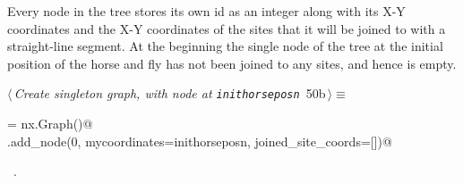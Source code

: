 \documentclass[11.5pt]{report}
\begin{document}
\vspace{-0.8cm} \newchunk Every node in the tree stores its own id as an integer along with 
its X-Y coordinates and the X-Y coordinates of the sites that it will be joined to with a 
straight-line segment. At the beginning the single node of the tree at the initial position
of the horse and fly has not been joined to any sites, and hence is empty. 

\begin{flushleft} \small
\begin{minipage}{\linewidth}\label{scrap74}\raggedright\small
{} $\langle\,${\itshape Create singleton graph, with node at \verb|inithorseposn|}\nobreak\ {\footnotesize {50b}}$\,\rangle\equiv$
\vspace{-1ex}
\begin{list}{}{} \item
\mbox{}\verb@G = nx.Graph()@\\
\mbox{}\verb@G.add_node(0, mycoordinates=inithorseposn, joined_site_coords=[])@\\
\mbox{}\verb@@{\NWsep}
\end{list}
\vspace{-1.5ex}
\footnotesize
\begin{list}{}{\setlength{\itemsep}{-\parsep}\setlength{\itemindent}{-\leftmargin}}
\item \NWtxtMacroRefIn\ .

\item{}
\end{list}
\end{minipage}\vspace{4ex}
\end{flushleft}
\end{document}
